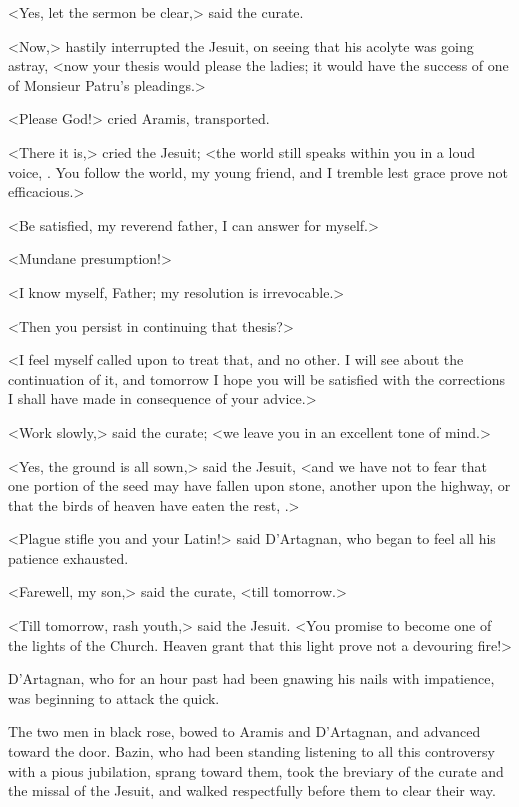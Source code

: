 <Yes, let the sermon be clear,> said the curate. 

<Now,> hastily interrupted the Jesuit, on seeing that his acolyte was going astray, <now your thesis would please the ladies; it would have the success of one of Monsieur Patru's pleadings.> 

<Please God!> cried Aramis, transported. 

<There it is,> cried the Jesuit; <the world still speaks within you in a loud voice, . You follow the world, my young friend, and I tremble lest grace prove not efficacious.> 

<Be satisfied, my reverend father, I can answer for myself.> 

<Mundane presumption!> 

<I know myself, Father; my resolution is irrevocable.> 

<Then you persist in continuing that thesis?> 

<I feel myself called upon to treat that, and no other. I will see about the continuation of it, and tomorrow I hope you will be satisfied with the corrections I shall have made in consequence of your advice.> 

<Work slowly,> said the curate; <we leave you in an excellent tone of mind.> 

<Yes, the ground is all sown,> said the Jesuit, <and we have not to fear that one portion of the seed may have fallen upon stone, another upon the highway, or that the birds of heaven have eaten the rest, .> 

<Plague stifle you and your Latin!> said D'Artagnan, who began to feel all his patience exhausted. 

<Farewell, my son,> said the curate, <till tomorrow.> 

<Till tomorrow, rash youth,> said the Jesuit. <You promise to become one of the lights of the Church. Heaven grant that this light prove not a devouring fire!> 

D'Artagnan, who for an hour past had been gnawing his nails with impatience, was beginning to attack the quick. 

The two men in black rose, bowed to Aramis and D'Artagnan, and advanced toward the door. Bazin, who had been standing listening to all this controversy with a pious jubilation, sprang toward them, took the breviary of the curate and the missal of the Jesuit, and walked respectfully before them to clear their way. 

